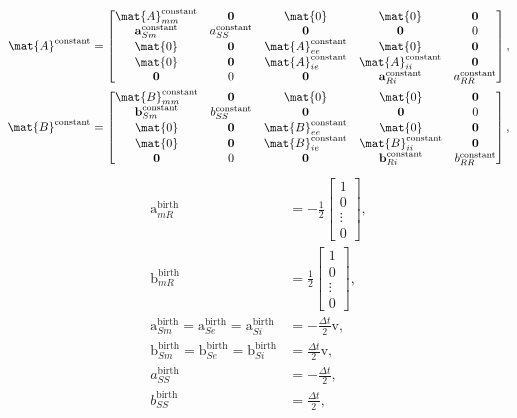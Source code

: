 \documentclass{jpmarticle}
\renewcommand{\vec}[1]{\boldsymbol{\mathrm{#1}}}
\begin{document}
\begin{equation}
  \begin{split}
    \mat{A}^{\text{constant}} &=
    \begin{bmatrix}
      \mat{A}_{mm}^{\text{constant}} & \vec{0} & \mat{0} & \mat{0} & \vec{0}
      \\
      \vec{a}_{Sm}^{\text{constant}} & a_{SS}^{\text{constant}} &
      \vec{0} & \vec{0} & 0
      \\
      \mat{0} & \vec{0} & \mat{A}_{ee}^{\text{constant}} & \mat{0} & \vec{0}
      \\
      \mat{0} & \vec{0} & \mat{A}_{ie}^{\text{constant}} &
      \mat{A}_{ii}^{\text{constant}} & \vec{0}
      \\
      \vec{0} & 0 & \vec{0} & \vec{a}_{Ri}^{\text{constant}} &
      a_{RR}^{\text{constant}}
    \end{bmatrix},
    \\
    \mat{B}^{\text{constant}} &=
    \begin{bmatrix}
      \mat{B}_{mm}^{\text{constant}} & \vec{0} & \mat{0} & \mat{0} & \vec{0}
      \\
      \vec{b}_{Sm}^{\text{constant}} & b_{SS}^{\text{constant}} &
      \vec{0} & \vec{0} & 0
      \\
      \mat{0} & \vec{0} & \mat{B}_{ee}^{\text{constant}} & \mat{0} & \vec{0}
      \\
      \mat{0} & \vec{0} & \mat{B}_{ie}^{\text{constant}} &
      \mat{B}_{ii}^{\text{constant}} & \vec{0}
      \\
      \vec{0} & 0 & \vec{0} & \vec{b}_{Ri}^{\text{constant}} &
      b_{RR}^{\text{constant}}
    \end{bmatrix},
  \end{split}
\end{equation}
\begin{equation}
  \begin{split}
    \vec{a}_{mR}^{\text{birth}} &=
    - \frac{1}{2}
    \begin{bmatrix}
      1 \\ 0 \\ \vdots \\ 0
    \end{bmatrix},
    \\
    \vec{b}_{mR}^{\text{birth}} &=
    \frac{1}{2}
    \begin{bmatrix}
      1 \\ 0 \\ \vdots \\ 0
    \end{bmatrix},
    \\
    \vec{a}_{Sm}^{\text{birth}} =
    \vec{a}_{Se}^{\text{birth}} =
    \vec{a}_{Si}^{\text{birth}} &=
    - \frac{\Delta t}{2} \vec{v},
    \\
    \vec{b}_{Sm}^{\text{birth}} =
    \vec{b}_{Se}^{\text{birth}} =
    \vec{b}_{Si}^{\text{birth}} &=
    \frac{\Delta t}{2} \vec{v},
    \\
    a_{SS}^{\text{birth}} &=
    - \frac{\Delta t}{2},
    \\
    b_{SS}^{\text{birth}} &=
    \frac{\Delta t}{2},
  \end{split}
\end{equation}
\end{document}
